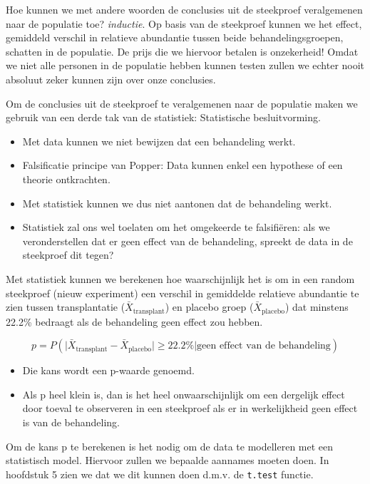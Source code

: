 \documentclass[
  dutch,
  letterpaper,
  12pt]{book}
\theoremstyle{definition}
\theoremstyle{definition}
\theoremstyle{definition}
\theoremstyle{remark}
\begin{document}
Hoe kunnen we met andere woorden de conclusies uit de steekproef
veralgemenen naar de populatie toe? \emph{inductie}. Op basis van de
steekproef kunnen we het effect, gemiddeld verschil in relatieve
abundantie tussen beide behandelingsgroepen, schatten in de populatie.
De prijs die we hiervoor betalen is onzekerheid! Omdat we niet alle
personen in de populatie hebben kunnen testen zullen we echter nooit
absoluut zeker kunnen zijn over onze conclusies.

Om de conclusies uit de steekproef te veralgemenen naar de populatie
maken we gebruik van een derde tak van de statistiek: Statistische
besluitvorming.

\begin{itemize}
\item
  Met data kunnen we niet bewijzen dat een behandeling werkt.
\item
  Falsificatie principe van Popper: Data kunnen enkel een hypothese of
  een theorie ontkrachten.
\item
  Met statistiek kunnen we dus niet aantonen dat de behandeling werkt.
\item
  Statistiek zal ons wel toelaten om het omgekeerde te falsifiëren: als
  we veronderstellen dat er geen effect van de behandeling, spreekt de
  data in de steekproef dit tegen?
\end{itemize}

Met statistiek kunnen we berekenen hoe waarschijnlijk het is om in een
random steekproef (nieuw experiment) een verschil in gemiddelde
relatieve abundantie te zien tussen transplantatie
(\(\bar X_\text{transplant}\)) en placebo groep
(\(\bar X_\text{placebo}\)) dat minstens 22.2\% bedraagt als de
behandeling geen effect zou hebben.

\[p=P( \vert \bar X_\text{transplant}-\bar X_\text{placebo}\vert \geq 22.2\% \vert \text{geen effect van de behandeling})\]

\begin{itemize}
\item
  Die kans wordt een p-waarde genoemd.
\item
  Als p heel klein is, dan is het heel onwaarschijnlijk om een dergelijk
  effect door toeval te observeren in een steekproef als er in
  werkelijkheid geen effect is van de behandeling.
\end{itemize}

Om de kans p te berekenen is het nodig om de data te modelleren met een
statistisch model. Hiervoor zullen we bepaalde aannames moeten doen. In
hoofdstuk 5 zien we dat we dit kunnen doen d.m.v. de \texttt{t.test}
functie.
\end{document}
